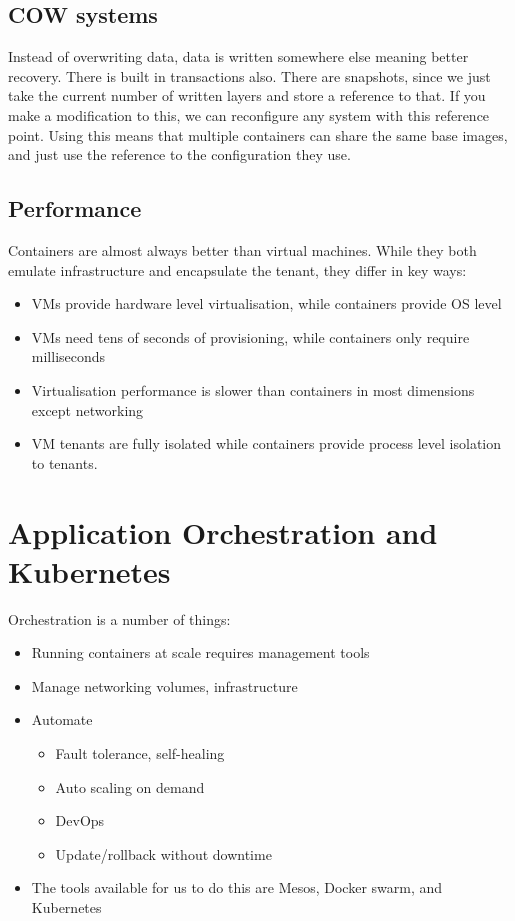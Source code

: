 \documentclass[11pt,a4paper,titlepage,dvipsnames,cmyk]{scrartcl}
\begin{document}
\subsection{COW systems}
Instead of overwriting data, data is written somewhere else meaning better recovery. There is built in transactions also. There are snapshots, since we just take the current number of written layers and store a reference to that. If you make a modification to this, we can reconfigure any system with this reference point. Using this means that multiple containers can share the same base images, and just use the reference to the configuration they use.

\subsection{Performance}
Containers are almost always better than virtual machines. While they both emulate infrastructure and encapsulate the tenant, they differ in key ways:
\begin{itemize}
    \item VMs provide hardware level virtualisation, while containers provide OS level
    \item VMs need tens of seconds of provisioning, while containers only require milliseconds
    \item Virtualisation performance is slower than containers in most dimensions except networking
    \item VM tenants are fully isolated while containers provide process level isolation to tenants.
\end{itemize}

\section{Application Orchestration and Kubernetes}
Orchestration is a number of things:
\begin{itemize}
    \item Running containers at scale requires management tools
    \item Manage networking volumes, infrastructure
    \item Automate
    \begin{itemize}
        \item Fault tolerance, self-healing
        \item Auto scaling on demand
        \item DevOps
        \item Update/rollback without downtime
    \end{itemize}
    \item The tools available for us to do this are Mesos, Docker swarm, and Kubernetes
\end{itemize}
\end{document}
